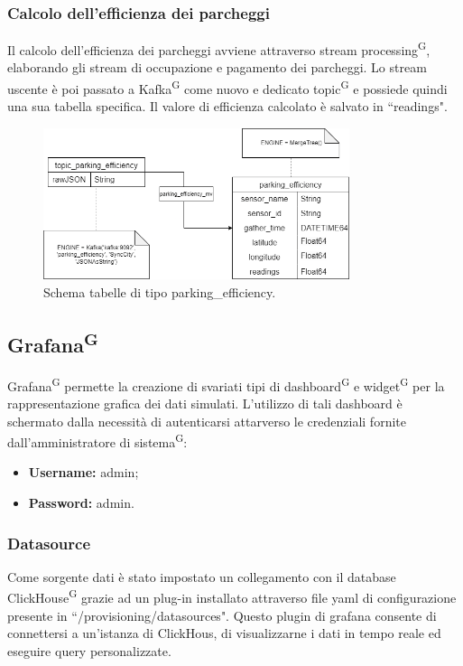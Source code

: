 \documentclass[8pt]{article}
\newcommand{\glossterm}[1]{#1\textsuperscript{G}} %
\begin{document}
\subsubsection{Calcolo dell'efficienza dei parcheggi}
Il calcolo dell'efficienza dei parcheggi avviene attraverso \glossterm{stream processing}, elaborando gli stream di occupazione e pagamento dei parcheggi. Lo stream uscente è poi passato a \glossterm{Kafka} come nuovo e dedicato \glossterm{topic} e possiede quindi una sua tabella specifica. Il valore di efficienza calcolato è salvato in ``readings".
\begin{figure}[h!]
    \centering
    \includegraphics[width=0.8\textwidth]{images_st/tabelle_parking_efficiency.png}
    \caption{Schema tabelle di tipo parking\_efficiency.}
    \label{fig:Schema tabelle di tipo parking_efficiency}
\end{figure}
\clearpage
\subsection{\glossterm{Grafana}}
\glossterm{Grafana} permette la creazione di svariati tipi di \glossterm{dashboard} e \glossterm{widget} per la rappresentazione grafica dei dati simulati. L'utilizzo di tali dashboard è schermato dalla necessità di autenticarsi attarverso le credenziali fornite dall'amministratore di \glossterm{sistema}:
\begin{itemize}
	\setlength\itemsep{0em}
    \item \textbf{Username:} admin;
    \item \textbf{Password:} admin.
\end{itemize}
\subsubsection{Datasource}
Come sorgente dati è stato impostato un collegamento con il database \glossterm{ClickHouse} grazie ad un plug-in installato attraverso file yaml di configurazione presente in ``/provisioning/datasources". Questo plugin di grafana consente di connettersi a un’istanza di ClickHous, di visualizzarne i dati in tempo reale ed eseguire query personalizzate.
\end{document}
